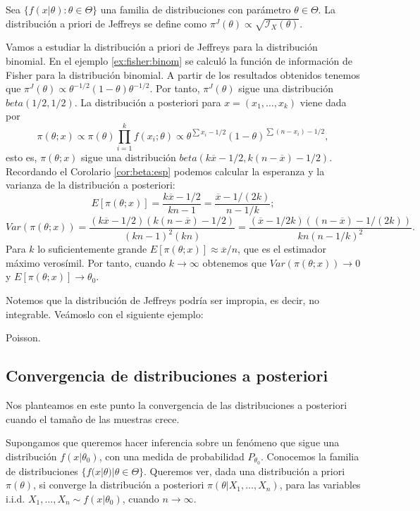 \documentclass{article}
\begin{document}
\begin{definition}
    Sea $\{f(x | \theta): \theta \in \Theta \}$ una familia de distribuciones con parámetro $\theta \in \Theta$. La distribución a priori de Jeffreys se define como $\pi^{J}(\theta) \propto \sqrt{\mathcal{I}_X(\theta)}$.
\end{definition}

\begin{ex}
    Vamos a estudiar la distribución a priori de Jeffreys para la distribución binomial. En el ejemplo \ref{ex:fisher:binom} se calculó la función de información de Fisher para la distribución binomial. A partir de los resultados obtenidos tenemos que $\pi^J(\theta) \propto \theta^{-1/2} (1 - \theta)\theta^{-1/2}$. Por tanto, $\pi^J(\theta)$ sigue una distribución $beta(1/2,1/2)$. La distribución a posteriori para $x = (x_1, \ldots, x_k)$ viene dada por
    \[\pi(\theta; x) \propto \pi(\theta) \prod_{i = 1}^k f(x_i; \theta) \propto \theta^{\sum x_i -1/2} (1 - \theta)^{\sum (n-x_i) -1/2},\]
    esto es, $\pi(\theta;x)$ sigue una distribución $beta(k\overline{x} -1/2, k(n - \overline{x}) - 1/2)$. Recordando el Corolario \ref{cor:beta:esp} podemos calcular la esperanza y la varianza de la distribución a posteriori:
    \[E[\pi(\theta; x)] = \frac{k\overline{x} -1/2}{kn - 1} = \frac{\overline{x} -1/(2k)}{n - 1/k};\]
    \[Var(\pi(\theta; x)) = \frac{(k\overline{x} -1/2)(k(n - \overline{x}) - 1/2)}{(kn - 1)^2(kn)} = \frac{(\overline{x} -1/{2k})((n - \overline{x}) - 1/(2k))}{kn(n - 1/k)^2}.\]
    Para $k$ lo suficientemente grande $E[\pi(\theta; x)] \approx \overline{x} / n$, que es el estimador máximo verosímil. Por tanto, cuando $k \to \infty$ obtenemos que $Var(\pi(\theta; x)) \to 0$ y $E[\pi(\theta; x)] \to \theta_0$.
\end{ex}

Notemos que la distribución de Jeffreys podría ser impropia, es decir, no integrable. Veámoslo con el siguiente ejemplo:

\begin{ex}
	Poisson.
\end{ex}

\subsection{Convergencia de distribuciones a posteriori}

Nos planteamos en este punto la convergencia de las distribuciones a posteriori cuando el tamaño de las muestras crece.

Supongamos que queremos hacer inferencia sobre un fenómeno que sigue una distribución $f(x|\theta_0)$, con una medida de probabilidad $P_{\theta_0}$. Conocemos la familia de distribuciones $\{f(x|\theta)|\theta\in\Theta\}$. Queremos ver, dada una distribución a priori $\pi(\theta)$, si converge la distribución a posteriori $\pi(\theta|X_1,\dots,X_n)$, para las variables i.i.d. $X_1,\dots,X_n \sim f(x|\theta_0)$,  cuando $n \to \infty$.
\end{document}
